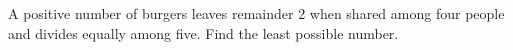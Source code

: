A positive number of burgers leaves remainder 2 when shared among four people and divides equally among five. Find the least possible number.
